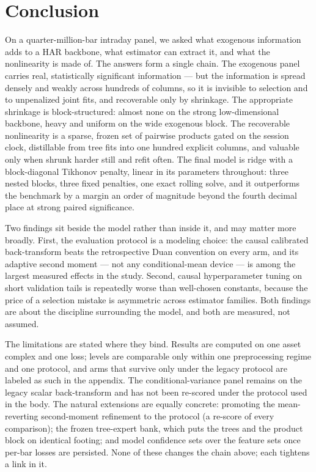 \section{Conclusion}
\label{sec:conclusion}

On a quarter-million-bar intraday panel, we asked what exogenous
information adds to a HAR backbone, what estimator can extract it, and
what the nonlinearity is made of. The answers form a single chain. The
exogenous panel carries real, statistically significant information ---
but the information is spread densely and weakly across hundreds of
columns, so it is invisible to selection and to unpenalized joint fits,
and recoverable only by shrinkage. The appropriate shrinkage is
block-structured: almost none on the strong low-dimensional backbone,
heavy and uniform on the wide exogenous block. The recoverable
nonlinearity is a sparse, frozen set of pairwise products gated on the
session clock, distillable from tree fits into one hundred explicit
columns, and valuable only when shrunk harder still and refit often. The
final model is ridge with a block-diagonal Tikhonov penalty, linear in its parameters throughout:
three nested blocks, three fixed penalties, one exact rolling solve, and it outperforms the
benchmark by a margin an order of magnitude beyond the fourth decimal
place at strong paired significance.

Two findings sit beside the model rather than inside it, and may matter
more broadly. First, the evaluation protocol is a modeling choice: the
causal calibrated back-transform beats the retrospective Duan convention
on every arm, and its adaptive second moment --- not any conditional-mean
device --- is among the largest measured effects in the study. Second,
causal hyperparameter tuning on short validation tails is repeatedly
worse than well-chosen constants, because the price of a selection
mistake is asymmetric across estimator families. Both findings are about
the discipline surrounding the model, and both are measured, not
assumed.

The limitations are stated where they bind. Results are computed on one
asset complex and one loss; levels are comparable only within one
preprocessing regime and one protocol, and arms that survive only under
the legacy protocol are labeled as such in the appendix. The
conditional-variance panel remains on the legacy scalar back-transform
and has not been re-scored under the protocol used in the body.
The natural extensions are equally concrete: promoting the
mean-reverting second-moment refinement to the protocol (a re-score of
every comparison); the frozen tree-expert bank, which puts the trees and
the product block on identical footing; and model confidence sets over
the feature sets once per-bar losses are persisted. None of these
changes the chain above; each tightens a link in it.
